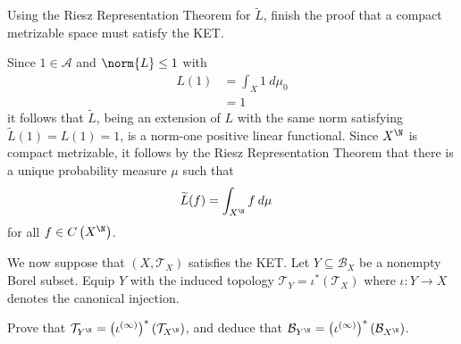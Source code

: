 \documentclass[10pt]{mypackage}
\begin{document}
\begin{problem}[Problem IV.9]
  Using the Riesz Representation Theorem for $ \widetilde{L} $, finish the proof that a compact metrizable space must satisfy the KET.
\end{problem}
\begin{solution}
  Since $1\in \mathcal{A}$ and $\norm{L}\leq 1$ with
  \begin{align*}
    L\left( 1 \right) &= \int_{X}^{} 1\:d\mu_0\\
                      &= 1
  \end{align*}
  it follows that $ \widetilde{L} $, being an extension of $L$ with the same norm satisfying $ \widetilde{L}(1) = L(1) = 1 $, is a norm-one positive linear functional. Since $X^{\N}$ is compact metrizable, it follows by the Riesz Representation Theorem that there is a unique probability measure $\mu$ such that
  \begin{align*}
    \widetilde{L}(f) &= \int_{X^{\N}}^{} f\:d\mu
  \end{align*}
  for all $f\in C\left( X^{\N} \right)$.
\end{solution}
\begin{problem}[Problem IV.10]
  We now suppose that $\left( X,\mathcal{T}_X \right)$ satisfies the KET. Let $Y\subseteq \mathcal{B}_X$ be a nonempty Borel subset. Equip $Y$ with the induced topology $ \mathcal{T}_Y = \iota^{\ast}\left( \mathcal{T}_X \right) $ where $\iota\colon Y\to X$ denotes the canonical injection.

  Prove that $\mathcal{T}_{Y^{\N}} = \left( \iota^{(\infty)} \right)^{\ast}\left( \mathcal{T}_{X^{\N}} \right)$, and deduce that $\mathcal{B}_{Y^{\N}} = \left( \iota^{(\infty)} \right)^{\ast}\left( \mathcal{B}_{X^{\N}} \right)$.
\end{problem}
\end{document}

